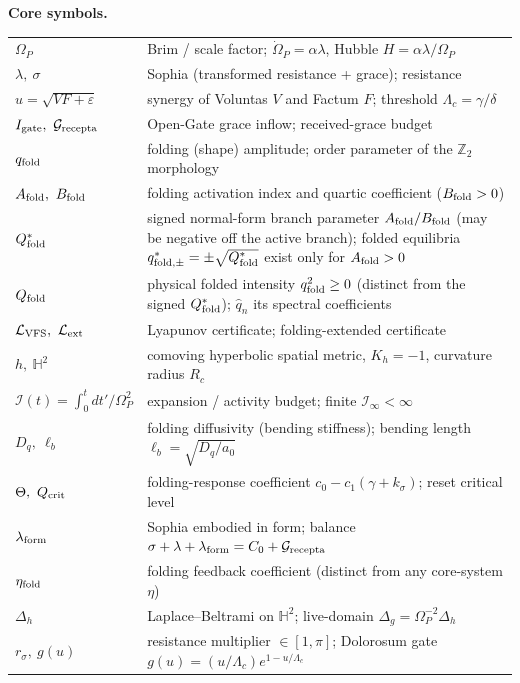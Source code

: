 \documentclass[11pt,a4paper,oneside]{book}
\newcommand{\Op}{\Omega_P}
\theoremstyle{plain}
\theoremstyle{definition}
\theoremstyle{remark}
\begin{document}
\medskip
\textbf{Core symbols.}
\begin{longtable}{L{0.22\textwidth} L{0.72\textwidth}}
\toprule
$\Op$ & Brim / scale factor; $\dot\Op=\alpha\lambda$, Hubble $H=\alpha\lambda/\Op$\\
$\lambda,\ \sigma$ & Sophia (transformed resistance + grace); resistance\\
$u=\sqrt{VF+\varepsilon}$ & synergy of Voluntas $V$ and Factum $F$; threshold $\Lambda_c=\gamma/\delta$\\
$I_{\rm gate},\ \mathcal{G}_{\rm recepta}$ & Open-Gate grace inflow; received-grace budget\\
$q_{\rm fold}$ & folding (shape) amplitude; order parameter of the $\mathbb Z_2$ morphology\\
$A_{\rm fold},\ B_{\rm fold}$ & folding activation index and quartic coefficient ($B_{\rm fold}>0$)\\
$Q_{\rm fold}^{*}$ & signed normal-form branch parameter $A_{\rm fold}/B_{\rm fold}$ (may be negative off the active branch); folded equilibria $q_{\rm fold,\pm}^{*}=\pm\sqrt{Q_{\rm fold}^{*}}$ exist only for $A_{\rm fold}>0$\\
$Q_{\rm fold}$ & physical folded intensity $q_{\rm fold}^{2}\ge0$ (distinct from the signed $Q_{\rm fold}^{*}$); $\widehat q_n$ its spectral coefficients\\
$\mathcal{L}_{\rm VFS},\ \mathcal{L}_{\rm ext}$ & Lyapunov certificate; folding-extended certificate\\
$h,\ \mathbb{H}^2$ & comoving hyperbolic spatial metric, $K_h=-1$, curvature radius $R_c$\\
$\mathcal I(t)=\int_0^t dt'/\Op^2$ & expansion / activity budget; finite $\mathcal I_\infty<\infty$\\
$D_q,\ \ell_b$ & folding diffusivity (bending stiffness); bending length $\ell_b=\sqrt{D_q/a_0}$\\
$\Theta,\ Q_{\rm crit}$ & folding-response coefficient $c_0-c_1(\gamma+k_\sigma)$; reset critical level\\
$\lambda_{\rm form}$ & Sophia embodied in form; balance $\sigma+\lambda+\lambda_{\rm form}=C_0+\mathcal{G}_{\rm recepta}$\\
$\eta_{\rm fold}$ & folding feedback coefficient (distinct from any core-system $\eta$)\\
$\Delta_h$ & Laplace--Beltrami on $\mathbb{H}^2$; live-domain $\Delta_g=\Op^{-2}\Delta_h$\\
$r_\sigma,\ g(u)$ & resistance multiplier $\in[1,\pi]$; Dolorosum gate $g(u)=(u/\Lambda_c)e^{1-u/\Lambda_c}$\\
\bottomrule
\end{longtable}
\end{document}
